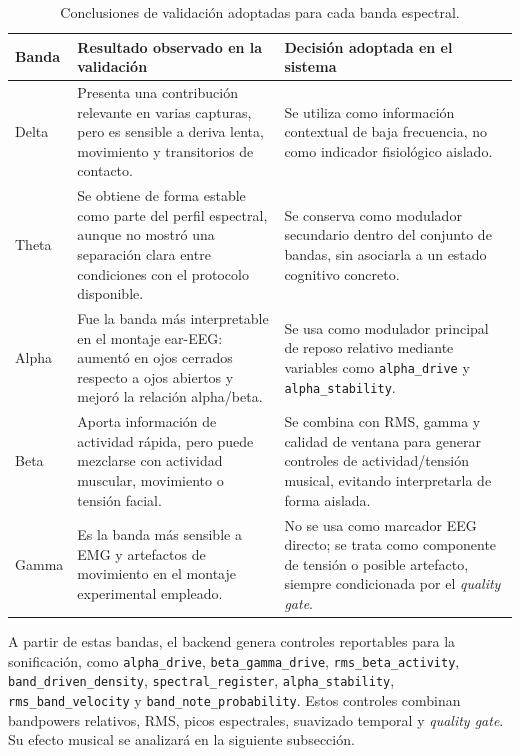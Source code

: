 \documentclass[../main.tex]{subfiles}
\begin{document}
\begin{table}[H]
    \centering
    \small
    \caption{Conclusiones de validación adoptadas para cada banda espectral.}
    \label{tab:validacion_decision_bandas}
    \begin{tabular}{p{} p{} p{}}
        \hline
        \textbf{Banda} & \textbf{Resultado observado en la validación} & \textbf{Decisión adoptada en el sistema} \\
        \hline
        Delta & Presenta una contribución relevante en varias capturas, pero es sensible a deriva lenta, movimiento y transitorios de contacto. & Se utiliza como información contextual de baja frecuencia, no como indicador fisiológico aislado. \\
        Theta & Se obtiene de forma estable como parte del perfil espectral, aunque no mostró una separación clara entre condiciones con el protocolo disponible. & Se conserva como modulador secundario dentro del conjunto de bandas, sin asociarla a un estado cognitivo concreto. \\
        Alpha & Fue la banda más interpretable en el montaje ear-EEG: aumentó en ojos cerrados respecto a ojos abiertos y mejoró la relación alpha/beta. & Se usa como modulador principal de reposo relativo mediante variables como \texttt{alpha\_drive} y \texttt{alpha\_stability}. \\
        Beta & Aporta información de actividad rápida, pero puede mezclarse con actividad muscular, movimiento o tensión facial. & Se combina con RMS, gamma y calidad de ventana para generar controles de actividad/tensión musical, evitando interpretarla de forma aislada. \\
        Gamma & Es la banda más sensible a EMG y artefactos de movimiento en el montaje experimental empleado. & No se usa como marcador EEG directo; se trata como componente de tensión o posible artefacto, siempre condicionada por el \textit{quality gate}. \\
        \hline
    \end{tabular}
\end{table}

A partir de estas bandas, el backend genera controles reportables para la sonificación, como \texttt{alpha\_drive}, \texttt{beta\_gamma\_drive}, \texttt{rms\_beta\_activity}, \texttt{band\_driven\_density}, \texttt{spectral\_register}, \texttt{alpha\_stability}, \texttt{rms\_band\_velocity} y \texttt{band\_note\_probability}. Estos controles combinan bandpowers relativos, RMS, picos espectrales, suavizado temporal y \textit{quality gate}. Su efecto musical se analizará en la siguiente subsección.
\end{document}
